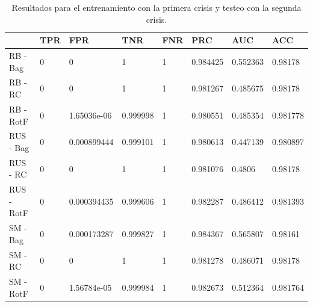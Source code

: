 \begin{table}\scriptsize
	\begin{center}
		\begin{tabular}{llllllll}
			\toprule
			{} & TPR &          FPR &       TNR & FNR &       PRC &       AUC &       ACC \\
			\midrule
			RB - Bag                &   0 &            0 &         1 &   1 &  0.984425 &  0.552363 &   0.98178 \\
			RB - RC       &   0 &            0 &         1 &   1 &  0.981267 &  0.485675 &   0.98178 \\
			RB - RotF        &   0 &  1.65036e-06 &  0.999998 &   1 &  0.980551 &  0.485354 &  0.981778 \\
			RUS - Bag          &   0 &  0.000899444 &  0.999101 &   1 &  0.980613 &  0.447139 &  0.980897 \\
			RUS - RC &   0 &            0 &         1 &   1 &  0.981076 &    0.4806 &   0.98178 \\
			RUS - RotF  &   0 &  0.000394435 &  0.999606 &   1 &  0.982287 &  0.486412 &  0.981393 \\
			SM - Bag                         &   0 &  0.000173287 &  0.999827 &   1 &  0.984367 &  0.565807 &   0.98161 \\
			SM - RC                &   0 &            0 &         1 &   1 &  0.981278 &  0.486071 &   0.98178 \\
			SM - RotF                 &   0 &  1.56784e-05 &  0.999984 &   1 &  0.982673 &  0.512364 &  0.981764 \\
			\bottomrule
		\end{tabular}
		\caption{Resultados para el entrenamiento con la primera crisis y testeo con la segunda crisis.}
		\label{tab:crisis1}
	\end{center}
\end{table}

